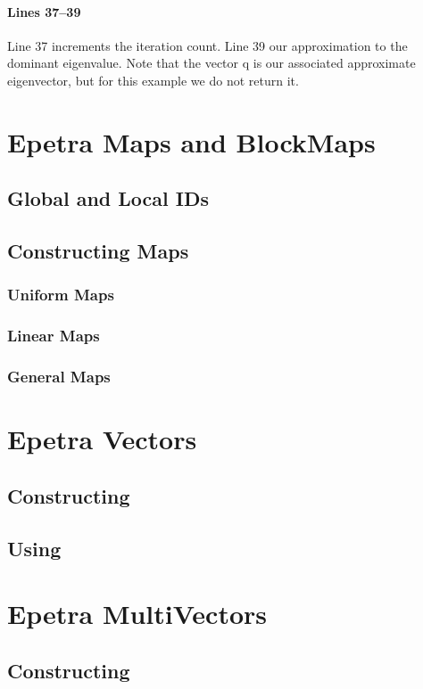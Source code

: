 \documentclass[12pt,relax]{EpetraUserGuide}
\begin{document}
\paragraph{Lines 37--39}
Line 37 increments the iteration count.  Line 39 our approximation to
the dominant eigenvalue.  Note that the vector q is our associated
approximate eigenvector, but for this example we do not return it.

\section{Epetra Maps and BlockMaps}
\subsection{Global and Local IDs}
\subsection{Constructing Maps}
\subsubsection{Uniform Maps}
\subsubsection{Linear Maps}
\subsubsection{General Maps}

\section{Epetra Vectors}
\subsection{Constructing \vectors{}}
\subsection{Using \vectors{}}
\section{Epetra MultiVectors}
\subsection{Constructing \multivectors{}}
\end{document}
